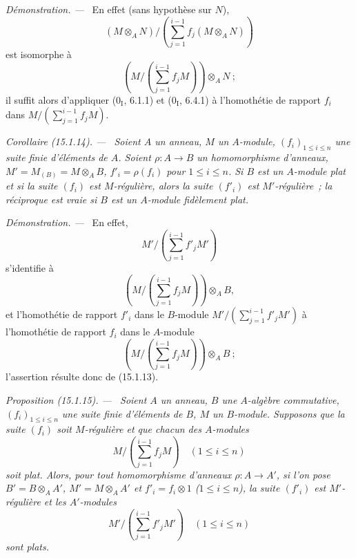 \documentclass[10pt,oneside]{book}
\makeatletter
\newcommand{\setmanualcurrentlabel}[1]{\def\@currentlabel{#1}}
\newenvironment{proposition}[1][]{%
  \setmanualcurrentlabel{#1}\par\medskip\noindent\itshape Proposition (#1). ---\ }{\par}
\newenvironment{corollary}[1][]{%
  \setmanualcurrentlabel{#1}\par\medskip\noindent\itshape Corollaire (#1). ---\ }{\par}
\newenvironment{proof}{%
  \par\medskip\noindent\textit{Démonstration. ---\ }}{\par}
\makeatother
\begin{document}
\begin{proof}
En effet (sans hypothèse sur $N$),
\[
  (M\otimes_A N)/
  \left(\sum_{j=1}^{i-1}f_j(M\otimes_A N)\right)
\]
est isomorphe à
\[
  \left(M/\left(\sum_{j=1}^{i-1}f_jM\right)\right)\otimes_A N~;
\]
il suffit alors d'appliquer ($0_{\mathrm I}$, 6.1.1) et
($0_{\mathrm I}$, 6.4.1) à l'homothétie de rapport $f_i$ dans
$M/(\sum_{j=1}^{i-1}f_jM)$.
\end{proof}

\begin{corollary}[15.1.14]
\label{0.15.1.14-fr}
Soient $A$ un anneau, $M$ un $A$-module, $(f_i)_{1\leq i\leq n}$ une suite
finie d'éléments de $A$. Soient $\rho:A\to B$ un homomorphisme d'anneaux,
$M'=M_{(B)}=M\otimes_A B$, $f'_i=\rho(f_i)$ pour $1\leq i\leq n$. Si $B$ est
un $A$-module plat et si la suite $(f_i)$ est $M$-régulière, alors la suite
$(f'_i)$ est $M'$-régulière~; la réciproque est vraie si $B$ est un
$A$-module fidèlement plat.
\end{corollary}

\begin{proof}
En effet,
\[
  M'/\left(\sum_{j=1}^{i-1}f'_jM'\right)
\]
s'identifie à
\[
  \left(M/\left(\sum_{j=1}^{i-1}f_jM\right)\right)\otimes_A B,
\]
et l'homothétie de rapport $f'_i$ dans le $B$-module
$M'/(\sum_{j=1}^{i-1}f'_jM')$ à l'homothétie de rapport $f_i$ dans le
$A$-module
\[
  \left(M/\left(\sum_{j=1}^{i-1}f_jM\right)\right)\otimes_A B~;
\]
l'assertion résulte donc de (15.1.13).
\end{proof}

\begin{proposition}[15.1.15]
\label{0.15.1.15-fr}
Soient $A$ un anneau, $B$ une $A$-algèbre commutative,
$(f_i)_{1\leq i\leq n}$ une suite finie d'éléments de $B$, $M$ un
$B$-module. Supposons que la suite $(f_i)$ soit $M$-régulière et que chacun
des $A$-modules
\[
  M/\left(\sum_{j=1}^{i-1}f_jM\right)\quad(1\leq i\leq n)
\]
soit plat. Alors, pour tout homomorphisme d'anneaux $\rho:A\to A'$, si l'on
pose $B'=B\otimes_A A'$, $M'=M\otimes_A A'$ et $f'_i=f_i\otimes1$
($1\leq i\leq n$), la suite $(f'_i)$ est $M'$-régulière et les
$A'$-modules
\[
  M'/\left(\sum_{j=1}^{i-1}f'_jM'\right)\quad(1\leq i\leq n)
\]
sont plats.
\end{proposition}
\end{document}
